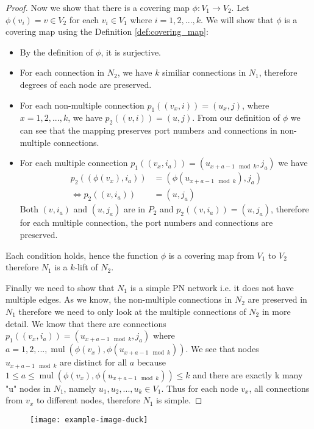 \begin{proof}
    Now we show that there is a covering map $\phi: V_1 \rightarrow V_2$.
    Let $\phi(v_i) = v \in V_2$ for each $v_i \in V_1$ where $i=1, 2, ..., k$.
    We will show that $\phi$ is a covering map using the Definition \ref{def:covering_map}:
    \begin{itemize}
        \item By the definition of $\phi$, it is surjective.
        \item For each connection in $N_2$, we have $k$ similiar connections in $N_1$, therefore degrees of each node are preserved.
        \item For each non-multiple connection $p_1((v_x, i)) = (u_x, j)$, where $x=1, 2, ..., k$, we have $p_2((v, i)) = (u, j)$.
        From our definition of $\phi$ we can see that the mapping preserves port numbers and connections in non-multiple connections.
        \item For each multiple connection $p_1((v_{x}, i_a)) = (u_{x+a-1 \mod k}, j_a)$ we have
        \begin{align*}
            p_2((\phi(v_{x}), i_a)) &= (\phi(u_{x+a-1 \mod k}), j_a)\\
            \Leftrightarrow p_2((v, i_a)) &= (u, j_a)
        \end{align*}
        Both $(v, i_a)$ and $(u, j_a)$ are in $P_2$ and $p_2((v, i_a)) = (u, j_a)$, therefore for each multiple connection, the port numbers and connections are preserved.
    \end{itemize}
    Each condition holds, hence the function $\phi$ is a covering map from $V_1$ to $V_2$
    therefore $N_1$ is a $k$-lift of $N_2$.

    Finally we need to show that $N_1$ is a simple PN network i.e. it does not have multiple edges.
    As we know, the non-multiple connections in $N_2$ are preserved in $N_1$ therefore we need to only look at the multiple connections of $N_2$ in more detail.
    We know that there are connections $p_1((v_{x}, i_a)) = (u_{x+a-1 \mod k}, j_a)$ where $a=1, 2, ..., \operatorname{mul}(\phi(v_{x}),\phi(u_{x+a-1 \mod k}))$.
     We see that nodes $u_{x+a-1 \mod k}$ are distinct for all $a$ because $1 \leq a \leq \operatorname{mul}(\phi(v_{x}),\phi(u_{x+a-1 \mod k})) \leq k$ and there are exactly k many "u" nodes in $N_1$, namely $u_1, u_2, ..., u_k \in V_1$.
     Thus for each node $v_x$, all connections from $v_x$ to different nodes, therefore $N_1$ is simple.
\end{proof}

\begin{figure}[H]
 \centering
 \texttt{[image: example-image-duck]}
 \caption{}
 \label{fig:duck2}
\end{figure}

